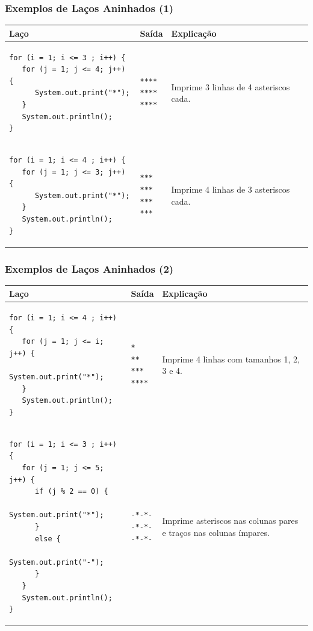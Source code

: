 \documentclass[xcolor={dvipsnames,table},aspectratio=169]{beamer}
\begin{document}
\begin{frame}[fragile]\frametitle{Exemplos de Laços Aninhados (1)}
\begin{center}
  \begin{tabular}{|p{6cm}|p{2cm}|p{5cm}|}
\hline
    \textbf{Laço} & \textbf{Saída} & \textbf{Explicação} \\
\hline
{\tiny
\begin{verbatim}
for (i = 1; i <= 3 ; i++) {
   for (j = 1; j <= 4; j++) {
      System.out.print("*");
   }
   System.out.println();
}
\end{verbatim}
}
&
{\tiny
\begin{verbatim}
****
****
****
\end{verbatim}
}
& Imprime 3 linhas de 4 asteriscos cada.\\
\hline
{\tiny
\begin{verbatim}
for (i = 1; i <= 4 ; i++) {
   for (j = 1; j <= 3; j++) {
      System.out.print("*");
   }
   System.out.println();
}
\end{verbatim}
}
&
{\tiny
\begin{verbatim}
***
***
***
***
\end{verbatim}
}
& Imprime 4 linhas de 3 asteriscos cada.\\
\hline
  \end{tabular}
\end{center}
\end{frame}

\begin{frame}[fragile]\frametitle{Exemplos de Laços Aninhados (2)}
\begin{center}
  \begin{tabular}{|p{6cm}|p{2cm}|p{5cm}|}
\hline
    \textbf{Laço} & \textbf{Saída} & \textbf{Explicação} \\
\hline
{\tiny
\begin{verbatim}
for (i = 1; i <= 4 ; i++) {
   for (j = 1; j <= i; j++) {
      System.out.print("*");
   }
   System.out.println();
}
\end{verbatim}
}
&
{\tiny
\begin{verbatim}
*
**
***
****
\end{verbatim}
}
& Imprime 4 linhas com tamanhos 1, 2, 3 e 4.\\
\hline
{\tiny
\begin{verbatim}
for (i = 1; i <= 3 ; i++) {
   for (j = 1; j <= 5; j++) {
      if (j % 2 == 0) {
         System.out.print("*");
      }
      else {
         System.out.print("-");
      }
   }
   System.out.println();
}
\end{verbatim}
}
&
{\tiny
\begin{verbatim}
-*-*-
-*-*-
-*-*-
\end{verbatim}
}
& Imprime asteriscos nas colunas pares e traços nas colunas ímpares.\\
\hline
  \end{tabular}
\end{center}
\end{frame}
\end{document}
